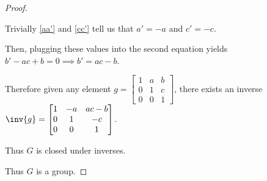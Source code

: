 \documentclass{article}
\begin{document}
\begin{proof}
\begin{enumerate}[label=(\roman*)]
    Trivially \eqref{aa'} and \eqref{cc'} tell us that \(a'=-a\) and \(c'=-c\).

    Then, plugging these values into the second equation yields \(b' - ac + b = 0\implies b' = ac - b\).

    Therefore given any element \(g=\begin{bmatrix}
        1 & a & b \\
        0 & 1 & c \\
        0 & 0 & 1
    \end{bmatrix}\), there exists an inverse \(\inv{g}=\begin{bmatrix}
        1 & -a & ac-b \\
        0 & 1 & -c \\
        0 & 0 & 1
    \end{bmatrix}\).

    Thus \(G\) is closed under inverses.
\end{enumerate}
Thus \(G\) is a group.
\end{proof}
\end{document}
